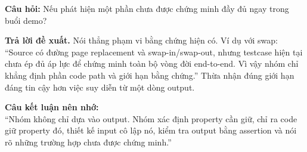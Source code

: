 \documentclass[11pt,a4paper]{article}
\newcommand{\q}[1]{%
  \vspace{0.55em}\noindent
  \colorbox{pale}{\parbox{\dimexpr\textwidth-2\fboxsep}{\textbf{\color{navy}Câu hỏi:} #1}}%
  \par\vspace{0.3em}}
\newcommand{\ans}[1]{\textbf{\color{cyan}Trả lời đề xuất.} #1\par}
\begin{document}
\q{Nếu phát hiện một phần chưa được chứng minh đầy đủ ngay trong buổi demo?}
\ans{Nói thẳng phạm vi bằng chứng hiện có. Ví dụ với swap: ``Source có đường
page replacement và swap-in/swap-out, nhưng testcase hiện tại chưa ép đủ áp lực
để chứng minh toàn bộ vòng đời end-to-end. Vì vậy nhóm chỉ khẳng định phần code
path và giới hạn bằng chứng.'' Thừa nhận đúng giới hạn đáng tin cậy hơn việc
suy diễn từ một dòng output.}

\begin{center}
\colorbox{palewarn}{\parbox{0.9\textwidth}{\centering
\textbf{Câu kết luận nên nhớ:}\\
``Nhóm không chỉ dựa vào output. Nhóm xác định property cần giữ, chỉ ra code giữ
property đó, thiết kế input cô lập nó, kiểm tra output bằng assertion và nói rõ
những trường hợp chưa được chứng minh.''}}
\end{center}
\end{document}
